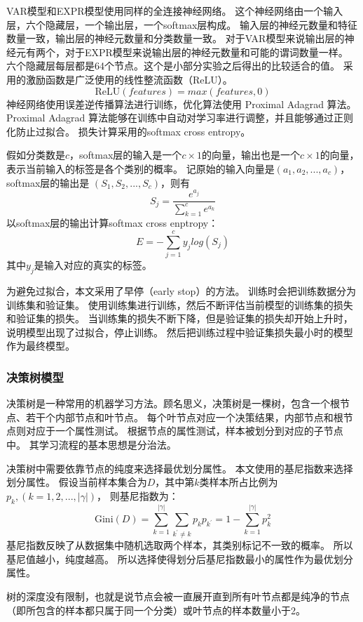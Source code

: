 VAR模型和EXPR模型使用同样的全连接神经网络。
这个神经网络由一个输入层，六个隐藏层，一个输出层，一个softmax层构成。
输入层的神经元数量和特征数量一致，输出层的神经元数量和分类数量一致。
对于VAR模型来说输出层的神经元有两个，对于EXPR模型来说输出层的神经元数量和可能的谓词数量一样。
六个隐藏层每层都是64个节点。这个是小部分实验之后得出的比较适合的值。
采用的激励函数是广泛使用的线性整流函数（ReLU）。
$$
\mathrm{ReLU}(features) = max(features, 0)
$$
神经网络使用误差逆传播算法进行训练，优化算法使用 Proximal Adagrad 算法。
Proximal Adagrad 算法能够在训练中自动对学习率进行调整，并且能够通过正则化防止过拟合。
损失计算采用的softmax cross entropy。

假如分类数是$c$，softmax层的输入是一个$c \times 1$的向量，输出也是一个$c \times 1$的向量，
表示当前输入的标签是各个类别的概率。
记原始的输入向量是$(a_1, a_2, ..., a_c)$，softmax层的输出是
$(S_1, S_2, ..., S_c)$，则有
$$
S_j = \frac{e^{a_j}}{\sum_{k=1}^c{e^{a_k}}}
$$
以softmax层的输出计算softmax cross enptropy：
$$
E = -\sum_{j = 1}^{c}{y_jlog(S_j)}
$$
其中$y_j$是输入对应的真实的标签。

为避免过拟合，本文采用了早停（early stop）的方法。
训练时会把训练数据分为训练集和验证集。
使用训练集进行训练，然后不断评估当前模型的训练集的损失和验证集的损失。
当训练集的损失不断下降，但是验证集的损失却开始上升时，
说明模型出现了过拟合，停止训练。
然后把训练过程中验证集损失最小时的模型作为最终模型。

\subsubsection{决策树模型}

决策树是一种常用的机器学习方法。顾名思义，决策树是一棵树，包含一个根节点、若干个内部节点和叶节点。
每个叶节点对应一个决策结果，内部节点和根节点则对应于一个属性测试。
根据节点的属性测试，样本被划分到对应的子节点中。
其学习流程的基本思想是分治法。

决策树中需要依靠节点的纯度来选择最优划分属性。
本文使用的基尼指数来选择划分属性。
假设当前样本集合为$D$，其中第$k$类样本所占比例为$p_k,(k=1,2,...,|\gamma|)$，
则基尼指数为：
$$
\mathrm{Gini}(D) = \sum_{k=1}^{|\gamma|}{\sum_{k^\prime \ne k}{p_kp_{k^\prime}}} = 1 - \sum_{k = 1}^{|\gamma|}p_k^2
$$
基尼指数反映了从数据集中随机选取两个样本，其类别标记不一致的概率。
所以基尼值越小，纯度越高。
所以选择使得划分后基尼指数最小的属性作为最优划分属性。

树的深度没有限制，也就是说节点会被一直展开直到所有叶节点都是纯净的节点（即所包含的样本都只属于同一个分类）或叶节点的样本数量小于2。


